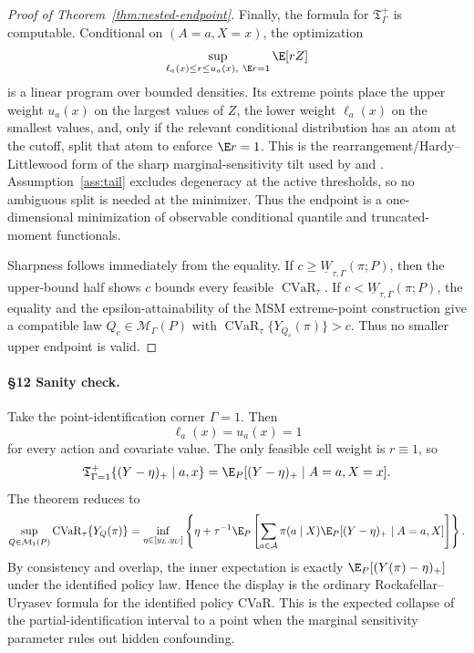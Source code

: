 \begin{proof}[Proof of Theorem~\ref{thm:nested-endpoint}]
Finally, the formula for \(\mathfrak T_\Gamma^+\) is computable.  Conditional on \((A=a,X=x)\), the
optimization
\[
\sup_{\ell_a(x)\le r\le u_a(x),\ \E r=1}\E[rZ]
\]
is a linear program over bounded densities.  Its extreme points place the upper weight \(u_a(x)\)
on the largest values of \(Z\), the lower weight \(\ell_a(x)\) on the smallest values, and, only if
the relevant conditional distribution has an atom at the cutoff, split that atom to enforce
\(\E r=1\).  This is the rearrangement/Hardy--Littlewood form of the sharp marginal-sensitivity
tilt used by \cite{DornGuo2021QuantileBalancing} and \cite{FrauenMelnychukFeuerriegel2023SharpCSA}.
Assumption~\ref{ass:tail} excludes degeneracy at the active thresholds, so no ambiguous split is
needed at the minimizer.  Thus the endpoint is a one-dimensional minimization of observable
conditional quantile and truncated-moment functionals.

Sharpness follows immediately from the equality.  If \(c\ge\underline W_{\tau,\Gamma}(\pi;P)\),
then the upper-bound half shows \(c\) bounds every feasible \(\operatorname{CVaR}_{\tau}\).  If
\(c<\underline W_{\tau,\Gamma}(\pi;P)\), the equality and the epsilon-attainability of the MSM
extreme-point construction give a compatible law \(Q_c\in\mathcal M_\Gamma(P)\) with
\(\operatorname{CVaR}_{\tau}\{Y_{Q_c}(\pi)\}>c\).  Thus no smaller upper endpoint is valid.
\end{proof}

\paragraph{\S12 Sanity check.}
Take the point-identification corner \(\Gamma=1\).  Then
\[
\ell_a(x)=u_a(x)=1
\]
for every action and covariate value.  The only feasible cell weight is \(r\equiv1\), so
\[
\mathfrak T_{\Gamma=1}^{+}\{(Y-\eta)_+\mid a,x\}
=
\E_P[(Y-\eta)_+\mid A=a,X=x].
\]
The theorem reduces to
\[
\sup_{Q\in\mathcal M_1(P)}
\operatorname{CVaR}_{\tau}\{Y_Q(\pi)\}
=
\inf_{\eta\in[y_L,y_U]}
\left\{\eta+\tau^{-1}
\E_P\left[
\sum_{a\in\mathcal A}\pi(a\mid X)
\E_P[(Y-\eta)_+\mid A=a,X]
\right]\right\}.
\]
By consistency and overlap, the inner expectation is exactly
\(\E_P[(Y(\pi)-\eta)_+]\) under the identified policy law.  Hence the display is the ordinary
Rockafellar--Uryasev formula for the identified policy CVaR.  This is the expected collapse of the
partial-identification interval to a point when the marginal sensitivity parameter rules out hidden
confounding.

